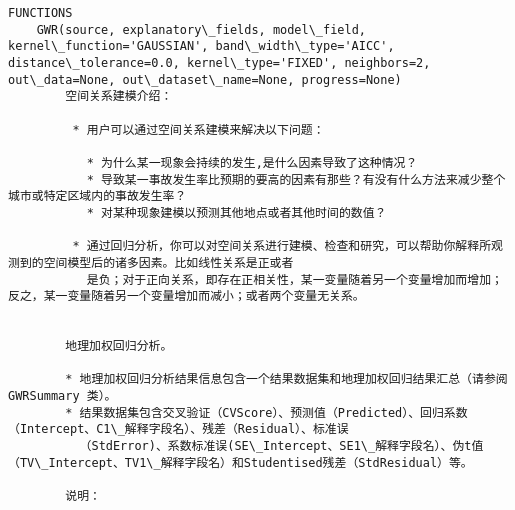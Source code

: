 \documentclass[11pt]{article}
\begin{document}
\begin{Verbatim}[commandchars=\\\{\}]
FUNCTIONS
    GWR(source, explanatory\_fields, model\_field, kernel\_function='GAUSSIAN', band\_width\_type='AICC', distance\_tolerance=0.0, kernel\_type='FIXED', neighbors=2, out\_data=None, out\_dataset\_name=None, progress=None)
        空间关系建模介绍：
        
         * 用户可以通过空间关系建模来解决以下问题：
        
           * 为什么某一现象会持续的发生,是什么因素导致了这种情况？
           * 导致某一事故发生率比预期的要高的因素有那些？有没有什么方法来减少整个城市或特定区域内的事故发生率？
           * 对某种现象建模以预测其他地点或者其他时间的数值？
        
         * 通过回归分析，你可以对空间关系进行建模、检查和研究，可以帮助你解释所观测到的空间模型后的诸多因素。比如线性关系是正或者
           是负；对于正向关系，即存在正相关性，某一变量随着另一个变量增加而增加；反之，某一变量随着另一个变量增加而减小；或者两个变量无关系。
        
        
        地理加权回归分析。
        
        * 地理加权回归分析结果信息包含一个结果数据集和地理加权回归结果汇总（请参阅 GWRSummary 类）。
        * 结果数据集包含交叉验证（CVScore）、预测值（Predicted）、回归系数（Intercept、C1\_解释字段名）、残差（Residual）、标准误
          （StdError)、系数标准误(SE\_Intercept、SE1\_解释字段名）、伪t值（TV\_Intercept、TV1\_解释字段名）和Studentised残差（StdResidual）等。
        
        说明：
        

\end{Verbatim}
\end{document}

